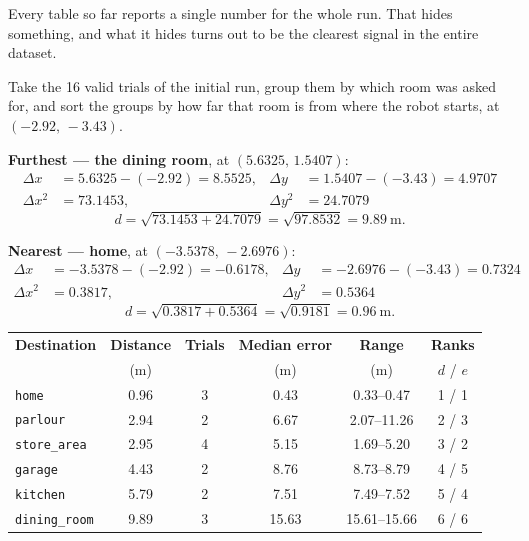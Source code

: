 \documentclass[11pt,a4paper]{report}
\newcommand{\file}[1]{\texttt{\small #1}}
\begin{document}
Every table so far reports a single number for the whole run. That hides
something, and what it hides turns out to be the clearest signal in the entire
dataset.

Take the 16 valid trials of the initial run, group them by which room was
asked for, and sort the groups by how far that room is from where the robot
starts, at $(-2.92,\, -3.43)$.

\begin{handbox}
\textbf{Furthest --- the dining room}, at $(5.6325,\, 1.5407)$:
\begin{align*}
\Delta x &= 5.6325 - (-2.92) = 8.5525, &
\Delta y &= 1.5407 - (-3.43) = 4.9707 \\
\Delta x^2 &= 73.1453, &
\Delta y^2 &= 24.7079
\end{align*}
\[
d = \sqrt{73.1453 + 24.7079} = \sqrt{97.8532} = \SI{9.89}{\metre}.
\]

\textbf{Nearest --- home}, at $(-3.5378,\, -2.6976)$:
\begin{align*}
\Delta x &= -3.5378 - (-2.92) = -0.6178, &
\Delta y &= -2.6976 - (-3.43) = 0.7324 \\
\Delta x^2 &= 0.3817, &
\Delta y^2 &= 0.5364
\end{align*}
\[
d = \sqrt{0.3817 + 0.5364} = \sqrt{0.9181} = \SI{0.96}{\metre}.
\]
\end{handbox}

\begin{center}
\small
\begin{tabular}{@{}lccccc@{}}
\toprule
\textbf{Destination} & \textbf{Distance} & \textbf{Trials} &
\textbf{Median error} & \textbf{Range} & \textbf{Ranks} \\
 & (\si{\metre}) & & (\si{\metre}) & (\si{\metre}) & $d$ / $e$ \\
\midrule
\file{home}         & 0.96 & 3 & 0.43  & 0.33--0.47  & 1 / 1 \\
\file{parlour}      & 2.94 & 2 & 6.67  & 2.07--11.26 & 2 / 3 \\
\file{store\_area}  & 2.95 & 4 & 5.15  & 1.69--5.20  & 3 / 2 \\
\file{garage}       & 4.43 & 2 & 8.76  & 8.73--8.79  & 4 / 5 \\
\file{kitchen}      & 5.79 & 2 & 7.51  & 7.49--7.52  & 5 / 4 \\
\file{dining\_room} & 9.89 & 3 & 15.63 & 15.61--15.66 & 6 / 6 \\
\bottomrule
\end{tabular}
\end{center}
\end{document}
